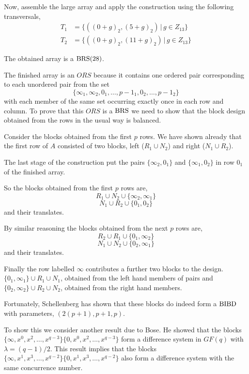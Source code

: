 \begin{example}
Now, assemble the large array and apply the construction using the following transversals,
\begin{align}
  T_1 &= \{((0 + g)_2, (5 + g)_2)\, |\, g \in Z_{13}\} \\
  T_2 &= \{((0 + g)_2, (11 + g)_2)\, |\, g \in Z_{13}\}
\end{align}

The obtained array is a $\operatorname{BRS}(28)$.

The finished array is an $ORS$ because it contains one ordered pair corresponding to each unordered pair from the set
\begin{equation}
\{\infty _1, \infty _2, 0_1, \ldots, p - 1_1, 0_2, \ldots, p - 1_2\}
\end{equation}
with each member of the same set occurring exactly once in each row and column.
To prove that this $ORS$ is a $\operatorname{BRS}$ we need to show that the block design obtained from the rows in the usual way is balanced.

Consider the blocks obtained from the first $p$ rows.
We have shown already that the first row of $A$ consisted of two blocks, left ($R_1 \cup N_2$) and right ($N_1 \cup R_2$).

The last stage of the construction put the pairs $\{\infty _2, 0_1\}$ and $\{\infty _1,0_2\}$ in row $0_1$ of the finished array.

So the blocks obtained from the first $p$ rows are,
\begin{equation}
  R_1 \cup N_2 \cup \{\infty _2, \infty _1 \}
\end{equation}
\begin{equation}
  N_1 \cup R_2 \cup \{0 _1, 0 _2 \}
\end{equation}
and their translates.

By similar reasoning the blocks obtained from the next $p$ rows are,
\begin{equation}
  R_2 \cup R_1 \cup \{0 _1, \infty _2 \}
\end{equation}
\begin{equation}
  N_1 \cup N_2 \cup \{0 _2, \infty _1 \}
\end{equation}
and their translates.

Finally the row labelled $\infty$ contributes a further two blocks to the design.
$\{0_1, \infty _1\} \cup R_1 \cup N_1$, obtained from the left hand members of pairs and $\{0_2, \infty _2\} \cup R_2 \cup N_2$, obtained from the right hand members.

Fortunately, Schellenberg has shown that these blocks do indeed form a $\operatorname{BIBD}$ with parameters, $(2(p + 1), p + 1, p)$.

To show this we consider another result due to Bose.
He showed that the blocks
$\{\infty, x^0, x^2, \ldots, x^{q - 3}\}\{0, x^0, x^2, \ldots, x^{q - 3}\}$
form a difference system in $GF(q)$ with
$\lambda = (q - 1)/2$.
This result implies that the blocks
$\{\infty, x^1, x^3, \ldots, x^{q - 2}\}\{0, x^1, x^3, \ldots, x^{q - 2}\}$
also form a difference system with the same concurrence number.
\end{example}

